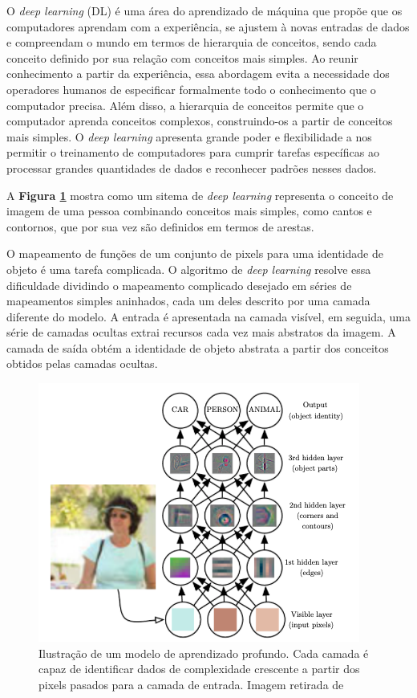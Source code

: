  O \textit{deep learning} (DL) é uma área do aprendizado de máquina que propõe que os computadores aprendam com a experiência, se ajustem à novas entradas de dados e compreendam o mundo em termos de hierarquia de conceitos, sendo cada conceito definido por sua relação com conceitos mais simples. 
 Ao reunir conhecimento a partir da experiência, essa abordagem evita a necessidade dos operadores humanos de especificar formalmente todo o conhecimento que o computador precisa. Além disso, a hierarquia de conceitos permite que o computador aprenda conceitos complexos, construindo-os a partir de conceitos mais simples. O \textit{deep learning} apresenta grande poder e flexibilidade a nos permitir o treinamento de computadores para cumprir tarefas específicas ao processar grandes quantidades de dados e reconhecer padrões nesses dados.


 A \textbf{Figura \ref{hierarquia-conceitos-dl}} mostra como um sitema de \textit{deep learning} representa o conceito de imagem de uma pessoa combinando conceitos mais simples, como cantos e contornos, que por sua vez são definidos em termos de arestas. 

 O mapeamento de funções de um conjunto de pixels para uma identidade de objeto é uma tarefa complicada. O algoritmo de \textit{deep learning} resolve essa dificuldade dividindo o mapeamento complicado desejado em séries de mapeamentos simples aninhados, cada um deles descrito por uma camada diferente do modelo. A entrada é apresentada na camada visível,
 em seguida, uma série de camadas ocultas extrai recursos cada vez mais abstratos da imagem. A camada de saída obtém a identidade de objeto abstrata a partir dos conceitos obtidos pelas camadas ocultas.


 \begin{figure}[h]
 \centering
 \includegraphics[width=.5 \textwidth]{conteudo/imgs/hierarquia-conceitos-dl.png}
 \caption[Ilustração de um modelo de aprendizado profundo]{Ilustração de um modelo de aprendizado profundo. Cada camada é capaz de identificar dados de complexidade crescente a partir dos pixels pasados para a camada de entrada. Imagem retirada de \cite{Goodfellow-et-al-2016}}
 \label{hierarquia-conceitos-dl}
 \end{figure}

